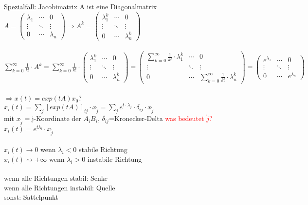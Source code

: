 \underline{Spezialfall:} Jacobimatrix A ist eine Diagonalmatrix\\

$A = 
\begin{pmatrix}
 \lambda_1 & \cdots & 0 \\
 \vdots  & \ddots & \vdots  \\
 0 & \cdots & \lambda_n
\end{pmatrix}
\Rightarrow
A^k = 
\begin{pmatrix}
 \lambda_1^k & \cdots & 0 \\
 \vdots  & \ddots & \vdots  \\
 0 & \cdots & \lambda_n^k
\end{pmatrix}$
\\\\

$\displaystyle \sum_{k=0}^{\infty} \frac{1}{k!} \cdot A^k=\displaystyle  \sum_{k=0}^{\infty} \frac{1}{k!} \cdot  
\begin{pmatrix}
 \lambda_1^k & \cdots & 0 \\
 \vdots  & \ddots & \vdots  \\
 0 & \cdots & \lambda_n^k
\end{pmatrix} = 
\begin{pmatrix}
 \sum_{k=0}^{\infty} \frac{1}{k!} \cdot \lambda_1^k & \cdots & 0 \\
 \vdots  & \ddots & \vdots  \\
 0 & \cdots & \sum_{k=0}^{\infty} \frac{1}{k!} \cdot \lambda_n^k
\end{pmatrix} = 
\begin{pmatrix}
 e^{\lambda_1} & \cdots & 0 \\
 \vdots  & \ddots & \vdots  \\
 0 & \cdots & e^{\lambda_n}
\end{pmatrix}
$
\\\\

$\Rightarrow x(t)=exp(tA)x_0$?\\
$x_i(t)=\sum_{j} [exp(tA)]_{ij} \cdot x_{\mathring{j}} = \sum_{j} e^{t \cdot \lambda_j} \cdot \delta_{ij} \cdot x_{\mathring{j}}$\\
mit $x_{\mathring{j}}=$j-Koordinate der $A_iB_i$, $\delta_{ij}$=Kronecker-Delta \textcolor{red}{was bedeutet $\mathring{j}$?}\\

$x_i(t)=e^{t \lambda_i} \cdot x_{\mathring{j}}$
\\\\
$x_i(t) \rightarrow 0$ wenn $\lambda_i < 0$ stabile Richtung\\
$x_i(t) \rightsquigarrow \pm \infty$ wenn $\lambda_i > 0$ instabile Richtung\\\\
wenn alle Richtungen stabil: Senke\\
wenn alle Richtungen instabil: Quelle\\
sonst: Sattelpunkt\\

